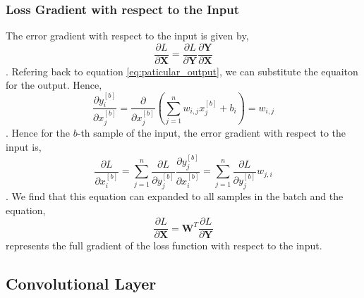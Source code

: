 \documentclass[11pt]{article}
\theoremstyle{definition}
\begin{document}
\subsubsection{Loss Gradient with respect to the Input}
The error gradient with respect to the input is given by,
\begin{equation}
    \frac{\partial L}{\partial \mathbf{X}} = \frac{\partial L}{\partial \mathbf{Y}} \frac{\partial \mathbf{Y}}{\partial \mathbf{X}}
\end{equation}
. Refering back to equation \ref{eq:paticular_output}, we can substitute the equaiton 
for the output. Hence,
\begin{equation}
    \frac{\partial y^{[b]}_i}{\partial x_j^{[b]}} = \frac{\partial}{\partial x_j^{[b]}} \left( \sum_{j=1}^{n} w_{i,j} x_j^{[b]} + b_i \right) = w_{i,j}
\end{equation}
. Hence for the $b$-th sample of the input, the error gradient with respect to the input
is, 
\begin{equation}
    \frac{\partial L}{\partial x^{[b]}_i} = \sum_{j=1}^{n} \frac{\partial L}{\partial y^{[b]}_j} \frac{\partial y^{[b]}_j}{\partial x^{[b]}_i} =
    \sum_{j=1}^{n} \frac{\partial L}{\partial y^{[b]}_j} w_{j,i}
\end{equation}
. We find that this equation can expanded to all samples in the batch and the
equation,
\begin{equation}
    \frac{\partial L}{\partial \mathbf{X}} = \mathbf{W}^T \frac{\partial L}{\partial \mathbf{Y}}
\end{equation}
represents the full gradient of the loss function with respect to the input.
\subsection{Convolutional Layer}
\end{document}
